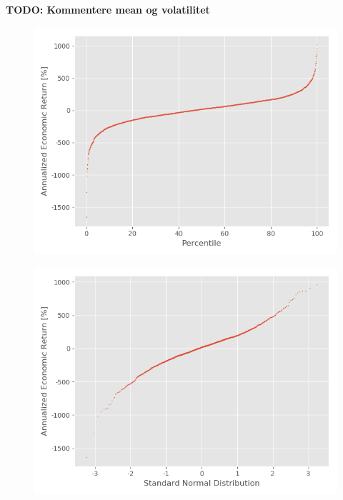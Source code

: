 \textbf{TODO: Kommentere mean og volatilitet}

\begin{figure}
\centering
\begin{minipage}{.5\textwidth}
  \centering
  \includegraphics[scale=0.5]{Plot/PercentilePlot.png}
  \label{PercentilePlot}
\end{minipage}%
\begin{minipage}{.5\textwidth}
  \centering
  \includegraphics[scale=0.5]{Plot/QQPlot.png}
  \label{QQPlot}
\end{minipage}
\end{figure}

